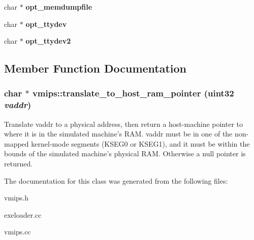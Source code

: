 \begin{DoxyCompactItemize}
\item 
\hypertarget{classvmips_a8cd1c860c1cb22767a3778330f18cdcc}{
char $\ast$ {\bfseries opt\_\-memdumpfile}}
\label{classvmips_a8cd1c860c1cb22767a3778330f18cdcc}

\item 
\hypertarget{classvmips_a174b8c59d240d8d8c69b07ae34d2b896}{
char $\ast$ {\bfseries opt\_\-ttydev}}
\label{classvmips_a174b8c59d240d8d8c69b07ae34d2b896}

\item 
\hypertarget{classvmips_ab9e2192b3fe2b29179fa01142055e2a6}{
char $\ast$ {\bfseries opt\_\-ttydev2}}
\label{classvmips_ab9e2192b3fe2b29179fa01142055e2a6}

\end{DoxyCompactItemize}


\subsection{Member Function Documentation}
\hypertarget{classvmips_aca7c30f28c9be1cbf9d0780d66d3393c}{
\subsubsection[{translate\_\-to\_\-host\_\-ram\_\-pointer}]{\setlength{\rightskip}{0pt plus 5cm}char $\ast$ vmips::translate\_\-to\_\-host\_\-ram\_\-pointer (uint32 {\em vaddr})}}
\label{classvmips_aca7c30f28c9be1cbf9d0780d66d3393c}
Translate vaddr to a physical address, then return a host-\/machine pointer to where it is in the simulated machine's RAM. vaddr must be in one of the non-\/mapped kernel-\/mode segments (KSEG0 or KSEG1), and it must be within the bounds of the simulated machine's physical RAM. Otherwise a null pointer is returned. 

The documentation for this class was generated from the following files:\begin{DoxyCompactItemize}
\item 
vmips.h\item 
exeloader.cc\item 
vmips.cc\end{DoxyCompactItemize}
